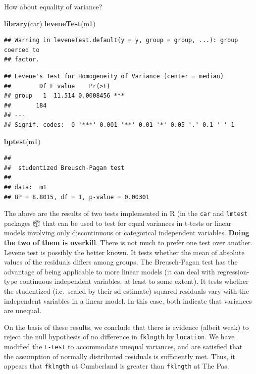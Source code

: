 \documentclass[
  12pt,
]{book}
\newenvironment{Shaded}{\begin{snugshade}}{\end{snugshade}}
\newcommand{\KeywordTok}[1]{\textcolor[rgb]{0.13,0.29,0.53}{\textbf{#1}}}
\newcommand{\NormalTok}[1]{#1}
\begin{document}
How about equality of variance?

\begin{Shaded}
\begin{Highlighting}[]
\KeywordTok{library}\NormalTok{(car)}
\KeywordTok{leveneTest}\NormalTok{(m1)}
\end{Highlighting}
\end{Shaded}

\begin{verbatim}
## Warning in leveneTest.default(y = y, group = group, ...): group coerced to
## factor.
\end{verbatim}

\begin{verbatim}
## Levene's Test for Homogeneity of Variance (center = median)
##        Df F value    Pr(>F)    
## group   1  11.514 0.0008456 ***
##       184                      
## ---
## Signif. codes:  0 '***' 0.001 '**' 0.01 '*' 0.05 '.' 0.1 ' ' 1
\end{verbatim}

\begin{Shaded}
\begin{Highlighting}[]
\KeywordTok{bptest}\NormalTok{(m1)}
\end{Highlighting}
\end{Shaded}

\begin{verbatim}
## 
##  studentized Breusch-Pagan test
## 
## data:  m1
## BP = 8.8015, df = 1, p-value = 0.00301
\end{verbatim}

The above are the results of two tests implemented in R (in the \texttt{car} and \texttt{lmtest} packages 📦 that can be used to test for equal variances in t-tests or linear models involving only discontinuous or categorical independent variables. \textbf{Doing the two of them is overkill}. There is not much to prefer one test over another. Levene test is possibly the
better known. It tests whether the mean of absolute values of the residuals differs among groups. The Breusch-Pagan test has the advantage of being applicable to more linear models (it can deal with regression-type continuous independent variables, at least to some extent). It tests whether the studentized (i.e.~scaled by their sd estimate) squared residuals vary with the independent variables in a linear model. In this case, both indicate that variances are unequal.

On the basis of these results, we conclude that there is evidence (albeit weak) to reject the null hypothesis of no difference in \texttt{fklngth} by \texttt{location}. We have modified the \texttt{t-test} to accommodate unequal variances, and are satisfied that the assumption of normally distributed residuals is sufficiently met. Thus, it appears that \texttt{fklngth} at Cumberland is greater than \texttt{fklngth} at The Pas.
\end{document}
